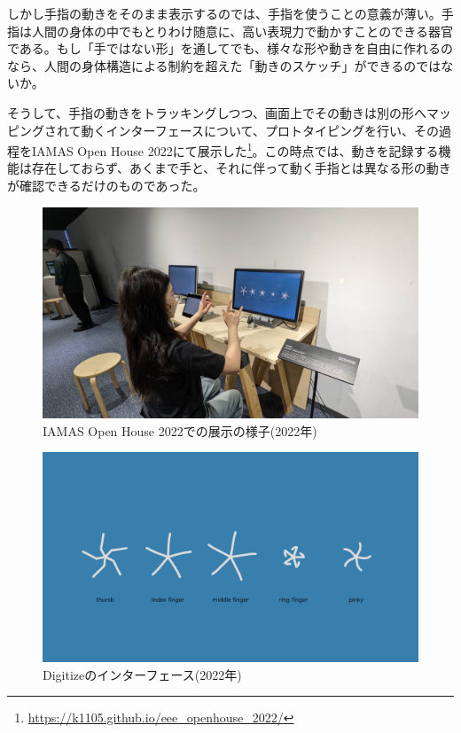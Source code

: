しかし手指の動きをそのまま表示するのでは、手指を使うことの意義が薄い。手指は人間の身体の中でもとりわけ随意に、高い表現力で動かすことのできる器官である。もし「手ではない形」を通してでも、様々な形や動きを自由に作れるのなら、人間の身体構造による制約を超えた「動きのスケッチ」ができるのではないか。

そうして、手指の動きをトラッキングしつつ、画面上でその動きは別の形へマッピングされて動くインターフェースについて、プロトタイピングを行い、その過程をIAMAS Open House 2022にて展示した\footnote{\url{https://k1105.github.io/eee_openhouse_2022/}}。この時点では、動きを記録する機能は存在しておらず、あくまで手と、それに伴って動く手指とは異なる形の動きが確認できるだけのものであった。

\begin{figure}[H]
  \centering
  \includegraphics[width=15cm]{img/openhouse2022.jpeg}
  \caption{IAMAS Open House 2022での展示の様子(2022年)}
  \label{fig:exhibit_2022}
\end{figure}

\begin{figure}[H]
  \centering
  \includegraphics[width=15cm]{img/openhouse2022_interface.png}
  \caption{Digitizeのインターフェース(2022年)}
  \label{fig:exhibit_2022_interface}
\end{figure}

